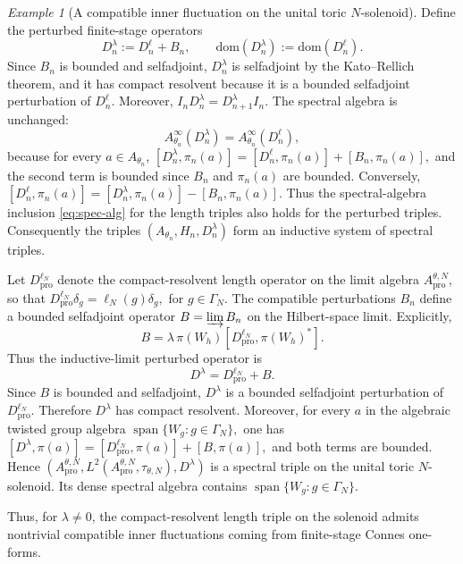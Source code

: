 \documentclass[11pt]{amsart}
\theoremstyle{definition}
\theoremstyle{remark}
\newtheorem{example}[theorem]{Example}
\newcommand{\ex}{\mathrm{pro}}
\newcommand{\dom}{\mathrm{dom}}
\begin{document}
\begin{example}[A compatible inner fluctuation on the unital toric \(N\)-solenoid]
Define the perturbed finite-stage operators
\[
D_n^\lambda:=D_n^\ell+B_n,
\qquad
\dom(D_n^\lambda):=\dom(D_n^\ell).
\]
Since $B_n$ is bounded and selfadjoint, $D_n^\lambda$ is selfadjoint by the
Kato--Rellich theorem, and it has compact resolvent because it is a bounded
selfadjoint perturbation of $D_n^\ell$. Moreover, $I_nD_n^\lambda=D_{n+1}^\lambda I_n.$
The spectral algebra is unchanged:
\[
A_{\theta_n}^{\infty}(D_n^\lambda)
=
A_{\theta_n}^{\infty}(D_n^\ell),
\]
because for every $a\in A_{\theta_n}$, $[D_n^\lambda,\pi_n(a)]=[D_n^\ell,\pi_n(a)]+[B_n,\pi_n(a)],$
and the second term is bounded since \(B_n\) and \(\pi_n(a)\) are bounded. Conversely,
$[D_n^\ell,\pi_n(a)]=[D_n^\lambda,\pi_n(a)]-[B_n,\pi_n(a)].$
Thus the spectral-algebra inclusion \eqref{eq:spec-alg} for the length triples
also holds for the perturbed triples. Consequently the triples $(A_{\theta_n},H_n,D_n^\lambda)$
form an inductive system of spectral triples. 

Let $D_{\ex}^{\ell_N}$ denote the compact-resolvent length operator on the limit algebra
$A_{\ex}^{\theta,N}$, so that $D_{\ex}^{\ell_N}\delta_g=\ell_N(g)\delta_g,$ for $ g\in\Gamma_N.$
The compatible perturbations $B_n$ define a bounded selfadjoint operator $B=\varinjlim B_n$
on the Hilbert-space limit. Explicitly,
\[
B
=
\lambda\,\pi(W_h)[D_{\ex}^{\ell_N},\pi(W_h)^*].
\]
Thus the inductive-limit perturbed operator is
\[
D^\lambda=D_{\ex}^{\ell_N}+B.
\]
Since $B$ is bounded and selfadjoint, $D^\lambda$ is a bounded selfadjoint
perturbation of $D_{\ex}^{\ell_N}$. Therefore $D^\lambda$ has compact
resolvent. Moreover, for every $a$ in the algebraic twisted group algebra $\operatorname{span}\{W_g:g\in\Gamma_N\},$
one has $[D^\lambda,\pi(a)]=[D_{\ex}^{\ell_N},\pi(a)]+[B,\pi(a)],$
and both terms are bounded. Hence $(A_{\ex}^{\theta,N},L^2(A_{\ex}^{\theta,N},\tau_{\theta,N}),D^\lambda)$
is a spectral triple on the unital toric $N$-solenoid. Its dense spectral
algebra contains $\operatorname{span}\{W_g:g\in\Gamma_N\}.$

Thus, for $\lambda\neq0$, the compact-resolvent length triple on the
solenoid admits nontrivial compatible inner fluctuations coming from
finite-stage Connes one-forms.
\end{example}
\end{document}
